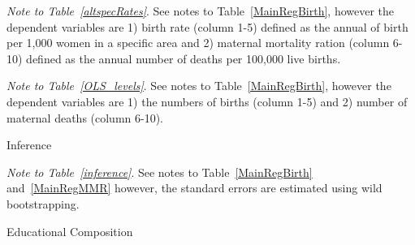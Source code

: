 \documentclass[a4paper, 11pt]{article}
\begin{document}
\begin{spacing}{1.4}
\begin{table}
\begin{ThreePartTable}
    \begin{tablenotes} 
      \tiny	\item \textit{Note to Table~\ref{altspecRates}}. See notes to Table~\ref{MainRegBirth}, however the dependent variables are 1) birth rate (column 1-5) defined as the annual of birth per 1,000 women in a specific area and 2) maternal mortality ration (column 6-10) defined as the annual number of deaths per 100,000 live births.\\
    \item \textit{Note to Table~\ref{OLS_levels}}. See notes to Table~\ref{MainRegBirth}, however the dependent variables are 1) the numbers of births (column 1-5) and 2) number of maternal deaths (column 6-10). 	
    \end{tablenotes} 
  \end{ThreePartTable}
\end{table} 
\restoregeometry


\begin{table}\caption{Inference} \label{inference}
  \begin{threeparttable}
    {\footnotesize 	}
    \begin{tablenotes}
      \footnotesize
    \item \textit{Note to Table~\ref{inference}}. See notes to Table~\ref{MainRegBirth} and~\ref{MainRegMMR} however, the standard errors are estimated using wild bootstrapping.  
    \end{tablenotes} 
  \end{threeparttable}
\end{table} 
\begin{table}[H]   \caption{Educational Composition} \label{educ_Birth_mmr}
  \begin{threeparttable}
    \begin{subtable}{\columnwidth} \centering {}\label{educ_b}
      {\small 	}
    \end{subtable}
    
    \begin{subtable}{\columnwidth} \centering {}\label{educ_m}
      {\small 	}
    \end{subtable}
    

\end{threeparttable}
\end{table}
\end{spacing}
\end{document}
